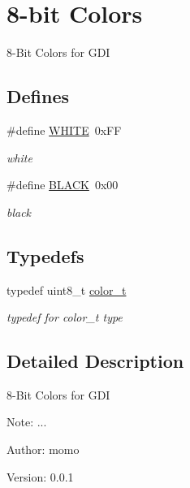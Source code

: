 \hypertarget{group__hgdi__colors8}{
\section{8-bit Colors}
\label{group__hgdi__colors8}
}
8-Bit Colors for GDI  


\subsection*{Defines}
\begin{CompactItemize}
\item 
\hypertarget{group__hgdi__colors8_g87b537f5fa5c109d3c05c13d6b18f382}{
\#define \hyperlink{group__hgdi__colors8_g87b537f5fa5c109d3c05c13d6b18f382}{WHITE}~0xFF}
\label{group__hgdi__colors8_g87b537f5fa5c109d3c05c13d6b18f382}

\begin{CompactList}\small\item\em white \item\end{CompactList}\item 
\hypertarget{group__hgdi__colors8_g7b3b25cba33b07c303f3060fe41887f6}{
\#define \hyperlink{group__hgdi__colors8_g7b3b25cba33b07c303f3060fe41887f6}{BLACK}~0x00}
\label{group__hgdi__colors8_g7b3b25cba33b07c303f3060fe41887f6}

\begin{CompactList}\small\item\em black \item\end{CompactList}\end{CompactItemize}
\subsection*{Typedefs}
\begin{CompactItemize}
\item 
\hypertarget{group__hgdi__colors8_g2d1e492285f42b7772298f092243fe6b}{
typedef uint8\_\-t \hyperlink{group__hgdi__colors8_g2d1e492285f42b7772298f092243fe6b}{color\_\-t}}
\label{group__hgdi__colors8_g2d1e492285f42b7772298f092243fe6b}

\begin{CompactList}\small\item\em typedef for color\_\-t type \item\end{CompactList}\end{CompactItemize}


\subsection{Detailed Description}
8-Bit Colors for GDI 

\begin{Desc}
\item[Note:]... \end{Desc}
\begin{Desc}
\item[Author:]momo \end{Desc}
\begin{Desc}
\item[Version:]0.0.1 \end{Desc}
